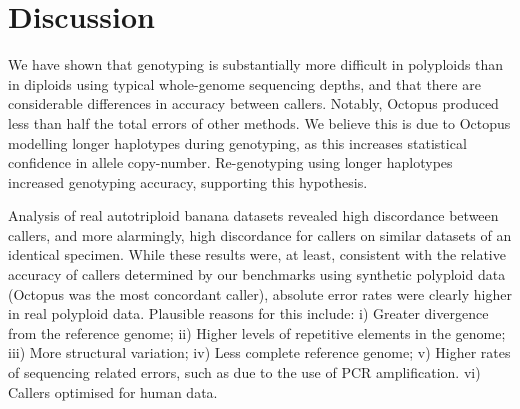 \documentclass[notitlepage, twocolumn, 10pt]{article}
\begin{document}
\begin{table}[bp]
%
\end{table}

\section*{Discussion}

We have shown that genotyping is substantially more difficult in polyploids than in diploids using typical whole-genome sequencing depths, and that there are considerable differences in accuracy between callers. Notably, Octopus produced less than half the total errors of other methods. We believe this is due to Octopus modelling longer haplotypes during genotyping, as this increases statistical confidence in allele copy-number. Re-genotyping using longer haplotypes increased genotyping accuracy, supporting this hypothesis.

Analysis of real autotriploid banana datasets revealed high discordance between callers, and more alarmingly, high discordance for callers on similar datasets of an identical specimen. While these results were, at least, consistent with the relative accuracy of callers determined by our benchmarks using synthetic polyploid data (Octopus was the most concordant caller), absolute error rates were clearly higher in real polyploid data. Plausible reasons for this include: i) Greater divergence from the reference genome; ii) Higher levels of repetitive elements in the genome; iii) More structural variation; iv) Less complete reference genome; v) Higher rates of sequencing related errors, such as due to the use of PCR amplification. vi) Callers optimised for human data.
\end{document}
